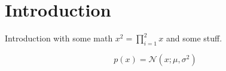\chapter[introduction]{Introduction}

Introduction with some math $x^2 = \prod_{i=1}^{2} x$ and some stuff.

$$
p(x) = \mathcal{N}(x; \mu, \sigma^2)
$$


